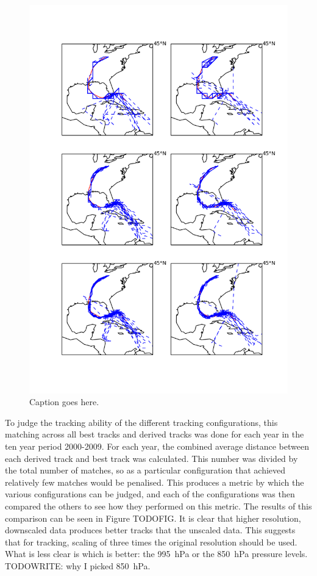 \documentclass[pdftex,12pt,a4paper]{report}
\begin{document}
\begin{figure}[hbp]
    \centering
    \includegraphics[width=\linewidth]{figures/katrina_six_tracking_configs}
    \caption{Caption goes here.}
    \label{fig:katrina_six_tracking_configs}
\end{figure}

To judge the tracking ability of the different tracking configurations, this matching across all
best tracks and derived tracks was done for each year in the ten year period 2000-2009.
For each year, the combined average distance between each derived track and best track was
calculated. This number was divided by the total number of matches, so as a particular configuration
that achieved relatively few matches would be penalised. This produces a metric by which the various
configurations can be judged, and each of the configurations was then compared the others to see how
they performed on this metric. The results of this comparison can be seen in Figure TODOFIG. It is clear
that higher resolution, downscaled data produces better tracks that the unscaled data. This suggests
that for tracking, scaling of three times the original resolution should be used. What is less clear
is which is better: the \SI{995}{hPa} or the \SI{850}{hPa} pressure levels. TODOWRITE: why I picked
\SI{850}{hPa}.
\end{document}
